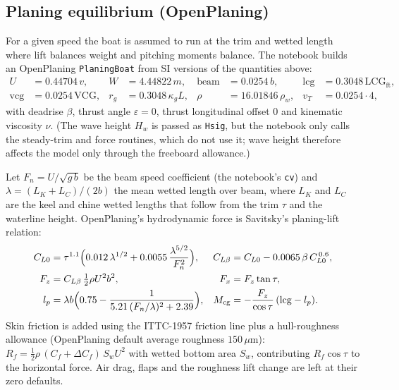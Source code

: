 \documentclass[11pt,a4paper]{article}
\renewcommand{\_}{\textunderscore\allowbreak}
\newcommand{\code}[1]{\texttt{#1}}
\newcommand{\lcg}{\mathrm{LCG}}
\newcommand{\vcg}{\mathrm{VCG}}
\begin{document}
\subsection{Planing equilibrium (OpenPlaning)}
\label{sec:planing}
For a given speed the boat is assumed to run at the trim and wetted length where lift balances weight and pitching
moments balance. The notebook builds an OpenPlaning \code{PlaningBoat} from SI versions of the quantities above:
\begin{align*}
  U &= 0.44704\,v, &
  W &= 4.44822\,m, &
  \text{beam} &= 0.0254\,b, &
  \text{lcg} &= 0.3048\,\lcg_{\mathrm{ft}},\\
  \text{vcg} &= 0.0254\,\vcg, &
  r_g &= 0.3048\,\kappa_g L, &
  \rho &= 16.01846\,\rho_w, &
  v_T &= 0.0254\cdot 4,
\end{align*}
with deadrise $\beta$, thrust angle $\varepsilon=0$, thrust longitudinal offset $0$ and kinematic viscosity $\nu$.
(The wave height $H_w$ is passed as \code{H\_sig}, but the notebook only calls the steady-trim and force routines, which do
not use it; wave height therefore affects the model only through the freeboard allowance.)

Let $F_{n}=U/\sqrt{g\,b}$ be the beam speed coefficient (the notebook's \code{cv}) and $\lambda=(L_K+L_C)/(2b)$ the mean wetted
length over beam, where $L_K$ and $L_C$ are the keel and chine wetted lengths that follow from the trim $\tau$ and the
waterline height. OpenPlaning's hydrodynamic force is Savitsky's planing-lift relation:
\begin{align}
  C_{L0} &= \tau^{1.1}\Bigl(0.012\,\lambda^{1/2} + 0.0055\,\frac{\lambda^{5/2}}{F_n^2}\Bigr), &
  C_{L\beta} &= C_{L0} - 0.0065\,\beta\,C_{L0}^{\,0.6},\nonumber\\
  F_z &= C_{L\beta}\,\tfrac12\rho U^2 b^2, &
  F_x &= F_z\tan\tau, \label{eq:savitsky}\\
  l_p &= \lambda b\Bigl(0.75 - \frac{1}{5.21\,(F_n/\lambda)^2 + 2.39}\Bigr), &
  M_{\mathrm{cg}} &= -\frac{F_z}{\cos\tau}\,(\mathrm{lcg} - l_p). \nonumber
\end{align}
Skin friction is added using the ITTC-1957 friction line plus a hull-roughness allowance (OpenPlaning default average
roughness $150\,\mu\mathrm m$): $R_f = \tfrac12\rho\,(C_f + \Delta C_f)\,S_w U^2$ with wetted bottom area $S_w$, contributing
$R_f\cos\tau$ to the horizontal force. Air drag, flaps and the roughness lift change are left at their zero defaults.
\end{document}
